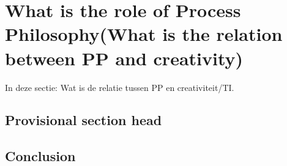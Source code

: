 \chapter{What is the role of Process Philosophy(What is the relation between PP and creativity)}

In deze sectie: Wat is de relatie tussen PP en creativiteit/TI.

\section{Provisional section head}
\section{Conclusion}

